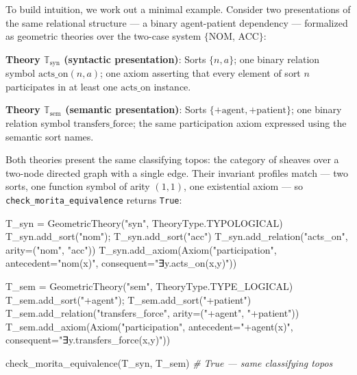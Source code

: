 \documentclass[
]{article}
\newenvironment{Shaded}{}{}
\newcommand{\CommentTok}[1]{\textcolor[rgb]{0.38,0.63,0.69}{\textit{#1}}}
\newcommand{\NormalTok}[1]{#1}
\newcommand{\OperatorTok}[1]{\textcolor[rgb]{0.40,0.40,0.40}{#1}}
\newcommand{\StringTok}[1]{\textcolor[rgb]{0.25,0.44,0.63}{#1}}
\begin{document}
To build intuition, we work out a minimal example. Consider two
presentations of the same relational structure --- a binary
agent-patient dependency --- formalized as geometric theories over the
two-case system \(\{\)NOM, ACC\(\}\):

\textbf{Theory \(\mathbb{T}_{\text{syn}}\) (syntactic presentation)}:
Sorts \(\{n, a\}\); one binary relation symbol
\(\text{acts\_on}(n, a)\); one axiom asserting that every element of
sort \(n\) participates in at least one \(\text{acts\_on}\) instance.

\textbf{Theory \(\mathbb{T}_{\text{sem}}\) (semantic presentation)}:
Sorts \(\{+\text{agent}, +\text{patient}\}\); one binary relation symbol
\(\text{transfers\_force}\); the same participation axiom expressed
using the semantic sort names.

Both theories present the same classifying topos: the category of
sheaves over a two-node directed graph with a single edge. Their
invariant profiles match --- two sorts, one function symbol of arity
\((1,1)\), one existential axiom --- so
\texttt{check\_morita\_equivalence} returns \texttt{True}:

\begin{Shaded}
\begin{Highlighting}[]
\NormalTok{T\_syn }\OperatorTok{=}\NormalTok{ GeometricTheory(}\StringTok{"syn"}\NormalTok{, TheoryType.TYPOLOGICAL)}
\NormalTok{T\_syn.add\_sort(}\StringTok{"nom"}\NormalTok{)}\OperatorTok{;}\NormalTok{ T\_syn.add\_sort(}\StringTok{"acc"}\NormalTok{)}
\NormalTok{T\_syn.add\_relation(}\StringTok{"acts\_on"}\NormalTok{, arity}\OperatorTok{=}\NormalTok{(}\StringTok{"nom"}\NormalTok{, }\StringTok{"acc"}\NormalTok{))}
\NormalTok{T\_syn.add\_axiom(Axiom(}\StringTok{"participation"}\NormalTok{, antecedent}\OperatorTok{=}\StringTok{"nom(x)"}\NormalTok{, consequent}\OperatorTok{=}\StringTok{"∃y.acts\_on(x,y)"}\NormalTok{))}

\NormalTok{T\_sem }\OperatorTok{=}\NormalTok{ GeometricTheory(}\StringTok{"sem"}\NormalTok{, TheoryType.TYPE\_LOGICAL)}
\NormalTok{T\_sem.add\_sort(}\StringTok{"+agent"}\NormalTok{)}\OperatorTok{;}\NormalTok{ T\_sem.add\_sort(}\StringTok{"+patient"}\NormalTok{)}
\NormalTok{T\_sem.add\_relation(}\StringTok{"transfers\_force"}\NormalTok{, arity}\OperatorTok{=}\NormalTok{(}\StringTok{"+agent"}\NormalTok{, }\StringTok{"+patient"}\NormalTok{))}
\NormalTok{T\_sem.add\_axiom(Axiom(}\StringTok{"participation"}\NormalTok{, antecedent}\OperatorTok{=}\StringTok{"+agent(x)"}\NormalTok{, consequent}\OperatorTok{=}\StringTok{"∃y.transfers\_force(x,y)"}\NormalTok{))}

\NormalTok{check\_morita\_equivalence(T\_syn, T\_sem)  }\CommentTok{\# True — same classifying topos}
\end{Highlighting}
\end{Shaded}
\end{document}
